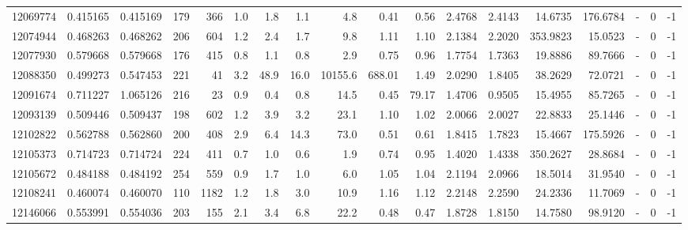 \begin{tabular}{rrrrrrrrrrrrrrrlrr}
  12069774 & 0.415165 &   0.415169 &  179 &  366 &      1.0 &      1.8 &     1.1 &      4.8 &       0.41 &        0.56 &  2.4768 &  2.4143 &   14.6735 &  176.6784 &             - &        0 &         -1 \\
  12074944 & 0.468263 &   0.468262 &  206 &  604 &      1.2 &      2.4 &     1.7 &      9.8 &       1.11 &        1.10 &  2.1384 &  2.2020 &  353.9823 &   15.0523 &             - &        0 &         -1 \\
  12077930 & 0.579668 &   0.579668 &  176 &  415 &      0.8 &      1.1 &     0.8 &      2.9 &       0.75 &        0.96 &  1.7754 &  1.7363 &   19.8886 &   89.7666 &             - &        0 &         -1 \\
  12088350 & 0.499273 &   0.547453 &  221 &   41 &      3.2 &     48.9 &    16.0 &  10155.6 &     688.01 &        1.49 &  2.0290 &  1.8405 &   38.2629 &   72.0721 &             - &        0 &         -1 \\
  12091674 & 0.711227 &   1.065126 &  216 &   23 &      0.9 &      0.4 &     0.8 &     14.5 &       0.45 &       79.17 &  1.4706 &  0.9505 &   15.4955 &   85.7265 &             - &        0 &         -1 \\
  12093139 & 0.509446 &   0.509437 &  198 &  602 &      1.2 &      3.9 &     3.2 &     23.1 &       1.10 &        1.02 &  2.0066 &  2.0027 &   22.8833 &   25.1446 &             - &        0 &         -1 \\
  12102822 & 0.562788 &   0.562860 &  200 &  408 &      2.9 &      6.4 &    14.3 &     73.0 &       0.51 &        0.61 &  1.8415 &  1.7823 &   15.4667 &  175.5926 &             - &        0 &         -1 \\
  12105373 & 0.714723 &   0.714724 &  224 &  411 &      0.7 &      1.0 &     0.6 &      1.9 &       0.74 &        0.95 &  1.4020 &  1.4338 &  350.2627 &   28.8684 &             - &        0 &         -1 \\
  12105672 & 0.484188 &   0.484192 &  254 &  559 &      0.9 &      1.7 &     1.0 &      6.0 &       1.05 &        1.04 &  2.1194 &  2.0966 &   18.5014 &   31.9540 &             - &        0 &         -1 \\
  12108241 & 0.460074 &   0.460070 &  110 & 1182 &      1.2 &      1.8 &     3.0 &     10.9 &       1.16 &        1.12 &  2.2148 &  2.2590 &   24.2336 &   11.7069 &             - &        0 &         -1 \\
  12146066 & 0.553991 &   0.554036 &  203 &  155 &      2.1 &      3.4 &     6.8 &     22.2 &       0.48 &        0.47 &  1.8728 &  1.8150 &   14.7580 &   98.9120 &             - &        0 &         -1 \\

\end{tabular}
